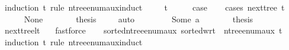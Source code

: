 \begin{isabellebody}
%
\isadelimproof
%
\endisadelimproof
%
\isatagproof
{}\isamarkupfalse%
\ {\isacharparenleft}{\kern0pt}induction\ t\ rule{\isacharcolon}{\kern0pt}\ n{\isacharunderscore}{\kern0pt}tree{\isacharunderscore}{\kern0pt}enum{\isacharunderscore}{\kern0pt}aux{\isachardot}{\kern0pt}induct{\isacharparenright}{\kern0pt}\isanewline
\ \ \isamarkupfalse%
\ {\isacharparenleft}{\kern0pt}{}\ t{\isacharparenright}{\kern0pt}\isanewline
\ \ \isamarkupfalse%
\ \isamarkupfalse%
\ {\isacharquery}{\kern0pt}case\isanewline
\ \ \isamarkupfalse%
\ {\isacharparenleft}{\kern0pt}cases\ {\isachardoublequoteopen}next{\isacharunderscore}{\kern0pt}tree\ t{\isachardoublequoteclose}{\isacharparenright}{\kern0pt}\isanewline
\ \ \ \ \isamarkupfalse%
\ None\isanewline
\ \ \ \ \isamarkupfalse%
\ \isamarkupfalse%
\ {\isacharquery}{\kern0pt}thesis\ \isamarkupfalse%
\ {}\ \isamarkupfalse%
\ auto\isanewline
\ \ \isamarkupfalse%
\isanewline
\ \ \ \ \isamarkupfalse%
\ {\isacharparenleft}{\kern0pt}Some\ a{\isacharparenright}{\kern0pt}\isanewline
\ \ \ \ \isamarkupfalse%
\ \isamarkupfalse%
\ {\isacharquery}{\kern0pt}thesis\ \isamarkupfalse%
\ next{\isacharunderscore}{\kern0pt}tree{\isacharunderscore}{\kern0pt}lt{\isacharprime}{\kern0pt}\ {}\ \isamarkupfalse%
\ fastforce\isanewline
\ \ \isamarkupfalse%
\isanewline
{}\isamarkupfalse%
%
\endisatagproof
{\isafoldproof}%
%
\isadelimproof
\isanewline
%
\endisadelimproof
\isanewline
{}\isamarkupfalse%
\ sorted{\isacharunderscore}{\kern0pt}n{\isacharunderscore}{\kern0pt}tree{\isacharunderscore}{\kern0pt}enum{\isacharunderscore}{\kern0pt}aux{\isacharcolon}{\kern0pt}\ {\isachardoublequoteopen}sorted{\isacharunderscore}{\kern0pt}wrt\ {\isacharparenleft}{\kern0pt}{\isachargreater}{\kern0pt}{\isacharparenright}{\kern0pt}\ {\isacharparenleft}{\kern0pt}n{\isacharunderscore}{\kern0pt}tree{\isacharunderscore}{\kern0pt}enum{\isacharunderscore}{\kern0pt}aux\ t{\isacharparenright}{\kern0pt}{\isachardoublequoteclose}\isanewline
%
\isadelimproof
%
\endisadelimproof
%
\isatagproof
{}\isamarkupfalse%
\ {\isacharparenleft}{\kern0pt}induction\ t\ rule{\isacharcolon}{\kern0pt}\ n{\isacharunderscore}{\kern0pt}tree{\isacharunderscore}{\kern0pt}enum{\isacharunderscore}{\kern0pt}aux{\isachardot}{\kern0pt}induct{\isacharparenright}{\kern0pt}\isanewline

\end{isabellebody}
